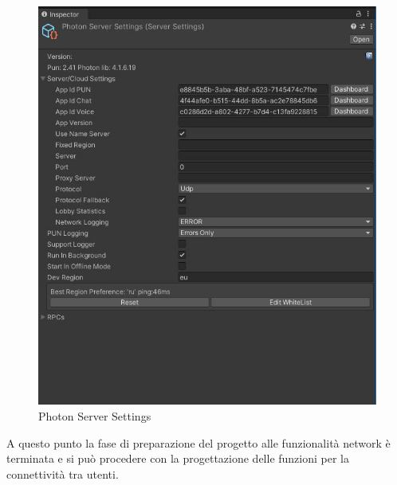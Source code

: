 \begin{figure}[H]
    \centering
    \includegraphics[scale = 0.7]{Immagini/Setting.jpg}
    \caption{Photon Server Settings}
    \label{fig:my_label}
\end{figure}
\hspace{-0.6cm}A questo punto la fase di preparazione del progetto alle funzionalità network è terminata e si può procedere con la progettazione delle funzioni per la connettività tra utenti.